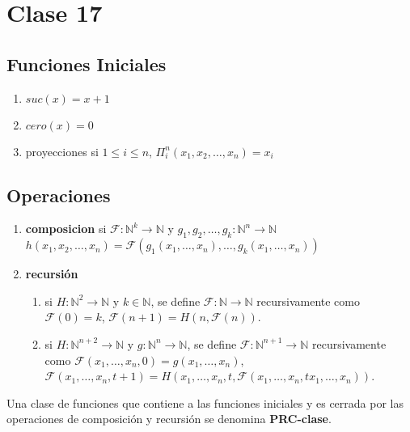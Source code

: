 \section{Clase 17}
 
\subsection{Funciones Iniciales}
 
\begin{enumerate}
	\item $suc(x) = x + 1$
	\item $cero(x) = 0$
	\item proyecciones si $1 \leq i \leq n$, $\varPi_{i}^{n}(x_1, x_2, \ldots, x_n) = x_i$
\end{enumerate}
 
\subsection{Operaciones}
 
\begin{enumerate}
	\item \textbf{composicion} si $\mathcal{F} \colon \mathbb{N}^{k} \rightarrow \mathbb{N}$ y $g_1, g_2, \ldots, g_k \colon \mathbb{N}^{n} \rightarrow \mathbb{N}$ $h(x_1, x_2, \ldots, x_n) = \mathcal{F}(g_1(x_1, \ldots, x_n), \ldots, g_k(x_1, \ldots, x_n))$
	\item \textbf{recursi\'on}
		\begin{enumerate}
			\item si $H \colon \mathbb{N}^2 \rightarrow \mathbb{N}$ y $k \in \mathbb{N}$, se define $\mathcal{F} \colon \mathbb{N} \rightarrow \mathbb{N}$ recursivamente como $\mathcal{F}(0) = k$, $\mathcal{F}(n + 1) = H(n, \mathcal{F}(n))$.
			\item si $H \colon \mathbb{N}^{n + 2} \rightarrow \mathbb{N}$ y $g \colon \mathbb{N}^{n} \rightarrow \mathbb{N}$, se define $\mathcal{F} \colon \mathbb{N}^{n + 1} \rightarrow \mathbb{N}$ recursivamente como $\mathcal{F}(x_1, \ldots, x_n, 0) = g(x_1, \ldots, x_n)$, $\mathcal{F}(x_1, \ldots, x_n, t + 1) = H(x_1, \ldots, x_n, t, \mathcal{F}(x_1, \ldots, x_n, tx_1, \ldots, x_n))$.
		\end{enumerate}
\end{enumerate}
 
\begin{definition}
Una clase de funciones que contiene a las funciones iniciales y es cerrada por las operaciones de composici\'on y recursi\'on se denomina \textbf{PRC-clase}.
\end{definition}
 
